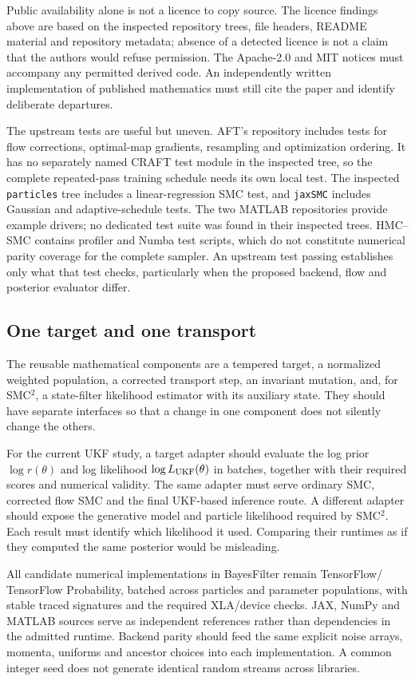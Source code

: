 Public availability alone is not a licence to copy source. The licence
findings above are based on the inspected repository trees, file headers,
README material and repository metadata; absence of a detected licence is
not a claim that the authors would refuse permission. The Apache-2.0 and
MIT notices must accompany any permitted derived code. An independently
written implementation of published mathematics must still cite the paper
and identify deliberate departures.

The upstream tests are useful but uneven. AFT's repository includes tests
for flow corrections, optimal-map gradients, resampling and optimization
ordering. It has no separately named CRAFT test module in the inspected
tree, so the complete repeated-pass training schedule needs its own local
test. The inspected \texttt{particles} tree includes a linear-regression
SMC test, and \texttt{jaxSMC} includes Gaussian and adaptive-schedule tests.
The two MATLAB repositories provide example drivers; no dedicated test
suite was found in their inspected trees. HMC--SMC contains profiler and
Numba test scripts, which do not constitute numerical parity coverage for
the complete sampler. An upstream test passing establishes only what that
test checks, particularly when the proposed backend, flow and posterior
evaluator differ.

\subsection{One target and one transport}

The reusable mathematical components are a tempered target, a normalized
weighted population, a corrected transport step, an invariant mutation,
and, for SMC$^2$, a state-filter likelihood estimator with its auxiliary
state. They should have separate interfaces so that a change in one
component does not silently change the others.

For the current UKF study, a target adapter should evaluate the log prior
$\log r(\theta)$ and log likelihood $\log L_{\rm UKF}(\theta)$ in batches,
together with their required scores and
numerical validity. The same adapter must serve ordinary SMC, corrected
flow SMC and the final UKF-based inference route. A different adapter
should expose the generative model and particle likelihood required by
SMC$^2$. Each result must identify which likelihood it used. Comparing
their runtimes as if they computed the same posterior would be misleading.

All candidate numerical implementations in BayesFilter remain TensorFlow/
TensorFlow Probability, batched across particles and parameter populations,
with stable traced signatures and the required XLA/device checks. JAX,
NumPy and MATLAB sources serve as independent references rather than
dependencies in the admitted runtime. Backend parity should feed the same
explicit noise arrays, momenta, uniforms and ancestor choices into each
implementation. A common integer seed does not generate identical random
streams across libraries.

